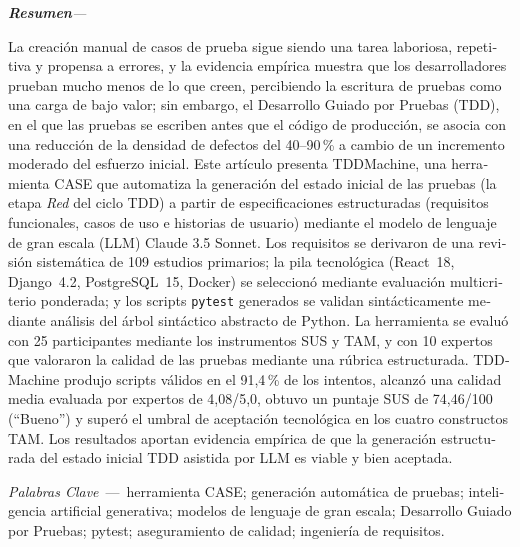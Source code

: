 \documentclass[10pt,journal,twoside,letterpaper]{IEEEtran}
\renewcommand{\figurename}{Fig.}%
\renewcommand{\tablename}{TABLE}%
\renewcommand{\refname}{References}%
\renewcommand{\bibname}{References}%
\newenvironment{resumen}{%
    \vspace{0.3em}
    \noindent\normalfont\small\itshape\textbf{Resumen}\hspace{0.5em}\textmd{---}\hspace{0.3em}%
    \ignorespaces
}{%
    \par\vspace{0.3em}%
}
\newcommand{\palabrasclave}[1]{%
    \vspace{0.2em}
    \noindent\small\textit{Palabras Clave}~---~#1
    \par\vspace{0.4em}
}
\begin{document}
    \begin{otherlanguage}{spanish}
        \begin{resumen}
            La creación manual de casos de prueba sigue siendo una tarea laboriosa, repetitiva y propensa a errores, y la evidencia empírica muestra que los desarrolladores prueban mucho menos de lo que creen, percibiendo la escritura de pruebas como una carga de bajo valor; sin embargo, el Desarrollo Guiado por Pruebas (TDD), en el que las pruebas se escriben antes que el código de producción, se asocia con una reducción de la densidad de defectos del 40--90\,\% a cambio de un incremento moderado del esfuerzo inicial. Este artículo presenta TDDMachine, una herramienta CASE que automatiza la generación del estado inicial de las pruebas (la etapa \emph{Red} del ciclo TDD) a partir de especificaciones estructuradas (requisitos funcionales, casos de uso e historias de usuario) mediante el modelo de lenguaje de gran escala (LLM) Claude 3.5 Sonnet. Los requisitos se derivaron de una revisión sistemática de 109 estudios primarios; la pila tecnológica (React~18, Django~4.2, PostgreSQL~15, Docker) se seleccionó mediante evaluación multicriterio ponderada; y los scripts \texttt{pytest} generados se validan sintácticamente mediante análisis del árbol sintáctico abstracto de Python. La herramienta se evaluó con 25 participantes mediante los instrumentos SUS y TAM, y con 10 expertos que valoraron la calidad de las pruebas mediante una rúbrica estructurada. TDDMachine produjo scripts válidos en el 91,4\,\% de los intentos, alcanzó una calidad media evaluada por expertos de 4,08/5,0, obtuvo un puntaje SUS de 74,46/100 (``Bueno'') y superó el umbral de aceptación tecnológica en los cuatro constructos TAM. Los resultados aportan evidencia empírica de que la generación estructurada del estado inicial TDD asistida por LLM es viable y bien aceptada.
        \end{resumen}
        
        \palabrasclave{herramienta CASE; generación automática de pruebas; inteligencia artificial generativa; modelos de lenguaje de gran escala; Desarrollo Guiado por Pruebas; pytest; aseguramiento de calidad; ingeniería de requisitos.}
    \end{otherlanguage}
    
    \renewcommand{\figurename}{Fig.}
    \renewcommand{\tablename}{TABLE}
    \renewcommand{\refname}{References}
    \renewcommand{\bibname}{References}
    
\end{document}
